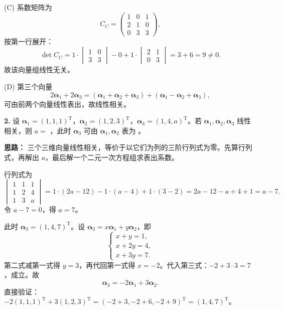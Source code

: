 (C) 系数矩阵为
\[
C_C=\begin{pmatrix}1&0&1\\2&1&0\\0&3&3\end{pmatrix},
\]
按第一行展开：
\[
\det C_C=1\cdot\begin{vmatrix}1&0\\3&3\end{vmatrix}
-0+1\cdot\begin{vmatrix}2&1\\0&3\end{vmatrix}
=3+6=9\neq 0.
\]
故该向量组线性无关。

(D) 第三个向量
\[
2\boldsymbol{\alpha}_1+2\boldsymbol{\alpha}_3
=(\boldsymbol{\alpha}_1+\boldsymbol{\alpha}_2+\boldsymbol{\alpha}_3)+(\boldsymbol{\alpha}_1-\boldsymbol{\alpha}_2+\boldsymbol{\alpha}_3),
\]
可由前两个向量线性表出，故线性相关。

\else \answerarea[4] \fi%

\textbf{2.} 设 $\boldsymbol{\alpha}_1=(1,1,1)^\mathrm{T}$，$\boldsymbol{\alpha}_2=(1,2,3)^\mathrm{T}$，$\boldsymbol{\alpha}_3=(1,4,a)^\mathrm{T}$。若 $\boldsymbol{\alpha}_1,\boldsymbol{\alpha}_2,\boldsymbol{\alpha}_3$ 线性相关，则 $a=$ \underline{\qquad}，此时 $\boldsymbol{\alpha}_3$ 可由 $\boldsymbol{\alpha}_1,\boldsymbol{\alpha}_2$ 表为 \underline{\qquad}。

\ifshowsolutions%
\quad
\textbf{思路：} 三个三维向量线性相关，等价于以它们为列的三阶行列式为零。先算行列式，再解出 $a$，最后解一个二元一次方程组求表出系数。

行列式为
\[
\begin{vmatrix}
1&1&1\\
1&2&4\\
1&3&a
\end{vmatrix}
=1\cdot(2a-12)-1\cdot(a-4)+1\cdot(3-2)
=2a-12-a+4+1=a-7.
\]
令 $a-7=0$，得 $a=7$。

此时 $\boldsymbol{\alpha}_3=(1,4,7)^\mathrm{T}$。设 $\boldsymbol{\alpha}_3=x\boldsymbol{\alpha}_1+y\boldsymbol{\alpha}_2$，即
\[
\begin{cases}
x+y=1,\\
x+2y=4,\\
x+3y=7.
\end{cases}
\]
第二式减第一式得 $y=3$，再代回第一式得 $x=-2$。代入第三式：$-2+3\cdot 3=7$，成立。故
\[
\boldsymbol{\alpha}_3=-2\boldsymbol{\alpha}_1+3\boldsymbol{\alpha}_2.
\]
直接验证：$-2(1,1,1)^\mathrm{T}+3(1,2,3)^\mathrm{T}=(-2+3,-2+6,-2+9)^\mathrm{T}=(1,4,7)^\mathrm{T}$。

